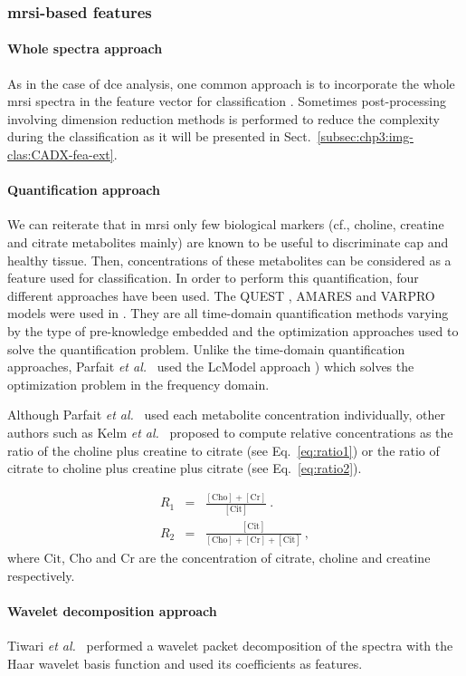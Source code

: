 \subsubsection{\Ac{mrsi}-based features}\label{subsubsec:chp3:img-clas:CADX-fea-dec:MRSI-fea}

\paragraph{Whole spectra approach}
As in the case of \ac{dce} analysis, one common approach is to incorporate the whole \ac{mrsi} spectra in the feature vector for classification \cite{Kelm2007,Parfait2012,Tiwari2007,Tiwari2009,Tiwari2013,Tiwari2009a,Tiwari2010,Viswanath2008a,Matulewicz2013}. 
Sometimes post-processing involving dimension reduction methods is performed to reduce the complexity during the classification as it will be presented in Sect.~\ref{subsec:chp3:img-clas:CADX-fea-ext}.

\paragraph{Quantification approach}
We can reiterate that in \ac{mrsi} only few biological markers (cf., choline, creatine and citrate metabolites mainly) are known to be useful to discriminate \ac{cap} and healthy tissue.
Then, concentrations of these metabolites can be considered as a feature used for classification.
In order to perform this quantification, four different approaches have been used.
The QUEST \cite{Ratiney2005}, AMARES \cite{Vanhamme1997} and VARPRO \cite{Coleman1993} models were used in \cite{Kelm2007}.
They are all time-domain quantification methods varying by the type of pre-knowledge embedded and the optimization approaches used to solve the quantification problem.
Unlike the time-domain quantification approaches, Parfait \textit{et al.}~\cite{Parfait2012} used the LcModel approach \cite{Provencher1993}) which solves the optimization problem in the frequency domain.

Although Parfait \textit{et al.}~\cite{Parfait2012} used each metabolite concentration individually, other authors such as Kelm \textit{et al.}~\cite{Kelm2007} proposed to compute relative concentrations as the ratio of the choline plus creatine to citrate (see Eq.~\eqref{eq:ratio1}) or the ratio of citrate to choline plus creatine plus citrate (see Eq.~\eqref{eq:ratio2}).

\begin{eqnarray}
	R_1 & = & \frac{ [ \text{Cho} ] + [ \text{Cr} ]}{[ \text{Cit} ]} \ . \label{eq:ratio1} \\
	R_2 & = & \frac{[ \text{Cit} ]}{[\text{Cho}]+[\text{Cr}]+[\text{Cit}]} \ , \label{eq:ratio2}
\end{eqnarray}
\noindent where $\text{Cit}$, $\text{Cho}$ and $\text{Cr}$ are the concentration of citrate, choline and creatine respectively.

\paragraph{Wavelet decomposition approach} 
Tiwari \textit{et al.}~\cite{Tiwari2012} performed a wavelet packet decomposition \cite{Coifman1992} of the spectra with the Haar wavelet basis function and used its coefficients as features.
